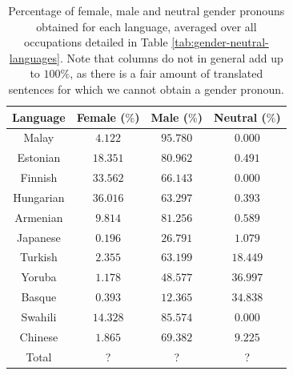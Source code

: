 \documentclass[fleqn,10pt]{article}
\begin{document}
\begin{table}[H]
\small{
	\centering
	\begin{tabular}{|c|c|c|c|}
	\hline
	Language 	& Female ($\%$) 	& Male ($\%$)		& Neutral ($\%$)	\\ \hline
	\hline
	Malay     	& $4.122$ 			& $95.780$  		& $0.000$			\\ \hline
	Estonian  	& $18.351$			& $80.962$  		& $0.491$			\\ \hline
	Finnish   	& $33.562$			& $66.143$  		& $0.000$			\\ \hline
	Hungarian 	& $36.016$			& $63.297$  		& $0.393$			\\ \hline
	Armenian  	& $9.814$			& $81.256$  		& $0.589$			\\ \hline
	Japanese  	& $0.196$			& $26.791$  		& $1.079$			\\ \hline
	Turkish   	& $2.355$			& $63.199$  		& $18.449$			\\ \hline
	Yoruba    	& $1.178$			& $48.577$  		& $36.997$			\\ \hline
	Basque    	& $0.393$			& $12.365$  		& $34.838$			\\ \hline
	Swahili   	& $14.328$ 			& $85.574$  		& $0.000$			\\ \hline
	Chinese   	& $1.865$ 			& $69.382$  		& $9.225$			\\ \hline \hline
	Total     	& ? 				& ? 				& ? 				\\ \hline
	\end{tabular}
	\caption{Percentage of female, male and neutral gender pronouns obtained for each language, averaged over all occupations detailed in Table \ref{tab:gender-neutral-languages}. Note that columns do not in general add up to $100\%$, as there is a fair amount of translated sentences for which we cannot obtain a gender pronoun.}
	\label{tab:gender-by-language}
	}
\end{table}
\end{document}
